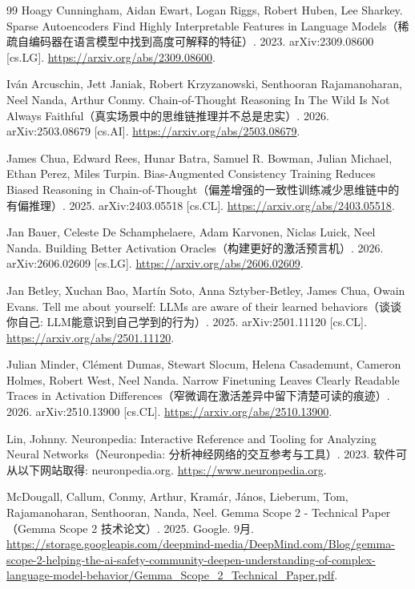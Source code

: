 \begin{thebibliography}{99}
 Hoagy Cunningham, Aidan Ewart, Logan Riggs, Robert Huben, Lee Sharkey. Sparse Autoencoders Find Highly Interpretable Features in Language Models（稀疏自编码器在语言模型中找到高度可解释的特征）. 2023. arXiv:2309.08600 [cs.LG]. \url{https://arxiv.org/abs/2309.08600}.

 Iván Arcuschin, Jett Janiak, Robert Krzyzanowski, Senthooran Rajamanoharan, Neel Nanda, Arthur Conmy. Chain-of-Thought Reasoning In The Wild Is Not Always Faithful（真实场景中的思维链推理并不总是忠实）. 2026. arXiv:2503.08679 [cs.AI]. \url{https://arxiv.org/abs/2503.08679}.

 James Chua, Edward Rees, Hunar Batra, Samuel R. Bowman, Julian Michael, Ethan Perez, Miles Turpin. Bias-Augmented Consistency Training Reduces Biased Reasoning in Chain-of-Thought（偏差增强的一致性训练减少思维链中的有偏推理）. 2025. arXiv:2403.05518 [cs.CL]. \url{https://arxiv.org/abs/2403.05518}.

 Jan Bauer, Celeste De Schamphelaere, Adam Karvonen, Niclas Luick, Neel Nanda. Building Better Activation Oracles（构建更好的激活预言机）. 2026. arXiv:2606.02609 [cs.LG]. \url{https://arxiv.org/abs/2606.02609}.

 Jan Betley, Xuchan Bao, Martín Soto, Anna Sztyber-Betley, James Chua, Owain Evans. Tell me about yourself: LLMs are aware of their learned behaviors（谈谈你自己: LLM能意识到自己学到的行为）. 2025. arXiv:2501.11120 [cs.CL]. \url{https://arxiv.org/abs/2501.11120}.

 Julian Minder, Clément Dumas, Stewart Slocum, Helena Casademunt, Cameron Holmes, Robert West, Neel Nanda. Narrow Finetuning Leaves Clearly Readable Traces in Activation Differences（窄微调在激活差异中留下清楚可读的痕迹）. 2026. arXiv:2510.13900 [cs.CL]. \url{https://arxiv.org/abs/2510.13900}.

 Lin, Johnny. Neuronpedia: Interactive Reference and Tooling for Analyzing Neural Networks（Neuronpedia: 分析神经网络的交互参考与工具）. 2023. 软件可从以下网站取得: neuronpedia.org. \url{https://www.neuronpedia.org}.

 McDougall, Callum, Conmy, Arthur, Kram{\'a}r, J{\'a}nos, Lieberum, Tom, Rajamanoharan, Senthooran, Nanda, Neel. {Gemma Scope 2} - Technical Paper（Gemma Scope 2 技术论文）. 2025. Google. 9月. \url{https://storage.googleapis.com/deepmind-media/DeepMind.com/Blog/gemma-scope-2-helping-the-ai-safety-community-deepen-understanding-of-complex-language-model-behavior/Gemma_Scope_2_Technical_Paper.pdf}.


\end{thebibliography}
